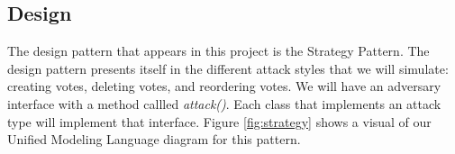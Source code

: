 \subsection{Design}

The design pattern that appears in this project is the Strategy Pattern.
The design pattern presents itself in the different attack styles that we will simulate: creating votes, deleting votes, and reordering votes.
We will have an adversary interface with a method callled \textit{attack()}.
Each class that implements an attack type will implement that interface.
Figure \ref{fig:strategy} shows a visual of our Unified Modeling Language diagram for this pattern.


